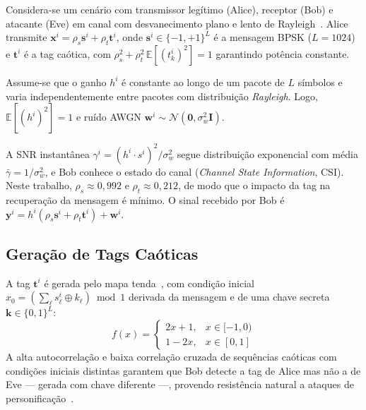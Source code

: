 \documentclass{sbrt}
\begin{document}
Considera-se um cenário com transmissor legítimo (Alice), receptor (Bob) e atacante (Eve) em canal com desvanecimento plano e lento de Rayleigh~\cite{ref_joao}. Alice transmite $\mathbf{x}^i = \rho_s \mathbf{s}^i + \rho_t \mathbf{t}^i$, onde $\mathbf{s}^i \in \{-1,+1\}^L$ é a mensagem BPSK ($L = 1024$) e $\mathbf{t}^i$ é a tag caótica, com $\rho_s^2 + \rho_t^2\,\mathbb{E}[(t_k^i)^2] = 1$ garantindo potência constante.

Assume-se que o ganho $h^i$ é constante ao longo de um pacote de $L$ símbolos e varia independentemente entre pacotes com distribuição \textit{Rayleigh}. Logo, $\mathbb{E}[(h^i)^2] = 1$ e ruído AWGN $\mathbf{w}^i \sim \mathcal{N}(\mathbf{0}, \sigma_w^2\mathbf{I})$.

A SNR instantânea $\gamma^i = (h^i \cdot s^i)^2/\sigma_w^2$ segue distribuição exponencial com média $\bar{\gamma} = 1/\sigma_w^2$, e Bob conhece o estado do canal (\textit{Channel State Information}, CSI). Neste trabalho, $\rho_s \approx 0{,}992$ e $\rho_t \approx 0{,}212$, de modo que o impacto da tag na recuperação da mensagem é mínimo. O sinal recebido por Bob é $\mathbf{y}^i = h^i(\rho_s \mathbf{s}^i + \rho_t \mathbf{t}^i) + \mathbf{w}^i$.


\subsection{Geração de Tags Caóticas}

A tag $\mathbf{t}^i$ é gerada pelo mapa tenda~\cite{ref_joao}, com condição inicial $x_0 = (\sum_\ell s^i_\ell \oplus k_\ell) \bmod 1$ derivada da mensagem e de uma chave secreta $\mathbf{k} \in \{0,1\}^L$:
\begin{equation}\label{eq:tentmap}
    f(x) = \begin{cases} 2x+1, & x \in [-1,0) \\ 1-2x, & x \in [0,1] \end{cases}
\end{equation}
A alta autocorrelação e baixa correlação cruzada de sequências caóticas com condições iniciais distintas garantem que Bob detecte a tag de Alice mas não a de Eve — gerada com chave diferente —, provendo resistência natural a ataques de personificação~\cite{ref_joao}.
\end{document}
